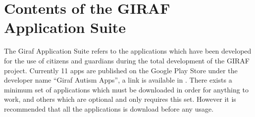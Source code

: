 \section{Contents of the GIRAF Application Suite}

The Giraf Application Suite refers to the applications which have been developed for the use of citizens and guardians during the total development of the GIRAF project. 
Currently 11 apps are published on the Google Play Store under the developer name ``Giraf Autism Apps'', a link is available in \cite{GIRAFGOOGLEPLAY}.
There exists a minimum set of applications which must be downloaded in order for anything to work, and others which are optional and only requires this set. 
However it is recommended that all the applications is download before any usage. 

